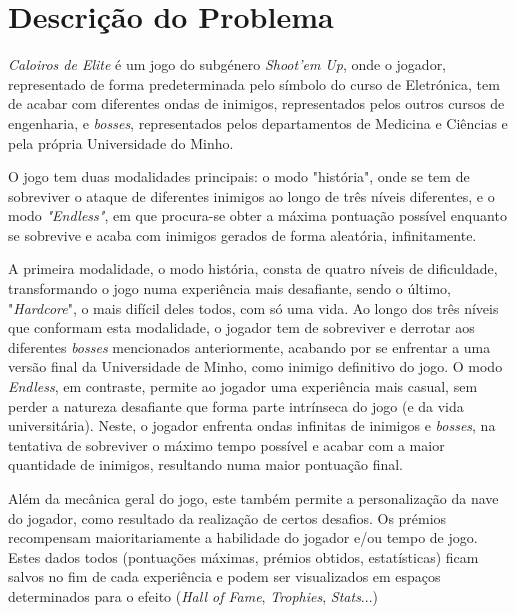 \documentclass[a4paper,11pt]{article}
\newcommand\tab[1][0.8cm]{\hspace*{#1}}
\begin{document}
\pagebreak

\section{Descrição do Problema}

\vspace{8pt}

\tab
\textit{Caloiros de Elite} é um jogo do subgénero \textit{Shoot'em Up}, onde o jogador, representado de forma predeterminada pelo símbolo do curso de Eletrónica, tem de acabar com diferentes ondas de inimigos, representados pelos outros cursos de engenharia, e \textit{bosses}, representados pelos departamentos de Medicina e Ciências e pela própria Universidade do Minho. 

\vspace{8pt}

O jogo tem duas modalidades principais: o modo "história", onde se tem de sobreviver o ataque de diferentes inimigos ao longo de três níveis diferentes, e o modo \textit{"Endless"}, em que procura-se obter a máxima pontuação possível enquanto se sobrevive e acaba com inimigos gerados de forma aleatória, infinitamente.

\vspace{8pt}

A primeira modalidade, o modo história, consta de quatro níveis de dificuldade, transformando o jogo numa experiência mais desafiante, sendo o último, "\textit{Hardcore}", o mais difícil deles todos, com só uma vida. Ao longo dos três níveis que conformam esta modalidade, o jogador tem de sobreviver e derrotar aos diferentes \textit{bosses} mencionados anteriormente, acabando por se enfrentar a uma versão final da Universidade de Minho, como inimigo definitivo do jogo. O modo \textit{Endless}, em contraste, permite ao jogador uma experiência mais casual, sem perder a natureza desafiante que forma parte intrínseca do jogo (e da vida universitária). Neste, o jogador enfrenta ondas infinitas de inimigos e \textit{bosses}, na tentativa de sobreviver o máximo tempo possível e acabar com a maior quantidade de inimigos, resultando numa maior pontuação final.

\vspace{8pt}

Além da mecânica geral do jogo, este também permite a personalização da nave do jogador, como resultado da realização de certos desafios. Os prémios recompensam maioritariamente a habilidade do jogador e/ou tempo de jogo. Estes dados todos (pontuações máximas, prémios obtidos, estatísticas) ficam salvos no fim de cada experiência e podem ser visualizados em espaços determinados para o efeito (\textit{Hall of Fame}, \textit{Trophies}, \textit{Stats}...)
\end{document}
